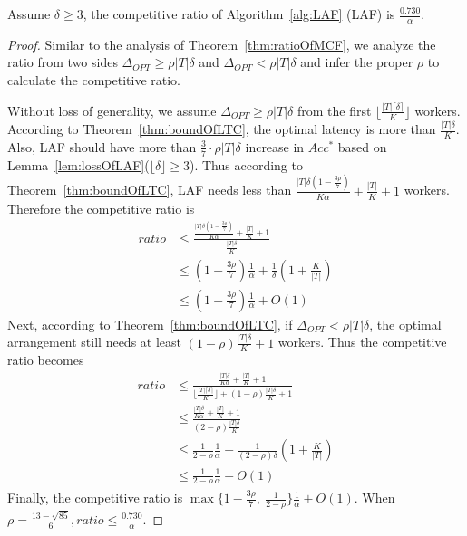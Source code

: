 \begin{theorem}
\label{thm:ratioOfLAF}
Assume $\delta \ge 3$, the competitive ratio of Algorithm~\ref{alg:LAF} (LAF) is $\frac{0.730}{\alpha}$.
\end{theorem}

\begin{proof}
Similar to the analysis of Theorem~\ref{thm:ratioOfMCF}, we analyze the ratio from two sides $\Delta_{OPT} \ge \rho |T|\delta$ and $\Delta_{OPT} < \rho |T|\delta$ and infer the proper $\rho$ to calculate the competitive ratio.

Without loss of generality, we assume $\Delta_{OPT} \ge \rho |T|\delta$ from the first $\lfloor \frac{|T|\lceil \delta \rceil}{K} \rfloor$ workers.
According to Theorem~\ref{thm:boundOfLTC}, the optimal latency is more than $\frac{|T|\delta}{K}$.
Also, LAF should have more than $\frac{3}{7} \cdot \rho |T|\delta$ increase in $Acc^*$ based on Lemma~\ref{lem:lossOfLAF}($\lfloor \delta \rfloor \ge 3$).
Thus according to Theorem~\ref{thm:boundOfLTC}, LAF needs less than $\frac{|T|\delta(1 - \frac{3\rho}{7})}{K\alpha} + \frac{|T|}{K} + 1$ workers.
Therefore the competitive ratio is
\begin{align*}
ratio &\le \frac{\frac{|T|\delta(1 - \frac{3\rho}{7})}{K\alpha} + \frac{|T|}{K} + 1}{\frac{|T|\delta}{K}} \\
		&\le (1-\frac{3\rho}{7})\frac{1}{\alpha} + \frac{1}{\delta}(1 + \frac{K}{|T|}) \\
		&\le (1-\frac{3\rho}{7})\frac{1}{\alpha} + O(1)
\end{align*}
Next, according to Theorem~\ref{thm:boundOfLTC}, if $\Delta_{OPT} < \rho |T|\delta$, the optimal arrangement still needs at least $(1-\rho)\frac{|T|\delta}{K} + 1$ workers.
Thus the competitive ratio becomes
\begin{align*}
ratio &\le \frac{\frac{|T|\delta}{K\alpha} + \frac{|T|}{K} + 1}{\lfloor \frac{|T|\lceil \delta \rceil}{K} \rfloor + (1-\rho)\frac{|T|\delta}{K} + 1} \\
		&\le \frac{\frac{|T|\delta}{K\alpha} + \frac{|T|}{K} + 1}{(2-\rho)\frac{|T|\delta}{K}} \\
		&\le \frac{1}{2-\rho}\frac{1}{\alpha} + \frac{1}{(2-\rho)\delta}(1 + \frac{K}{|T|}) \\
		&\le \frac{1}{2-\rho}\frac{1}{\alpha} + O(1)
\end{align*}
Finally, the competitive ratio is $\max\{1-\frac{3\rho}{7},\ \frac{1}{2-\rho}\} \frac{1}{\alpha} + O(1)$.
When $\rho = \frac{13-\sqrt{85}}{6}, ratio \le \frac{0.730}{\alpha}$.
\end{proof}

